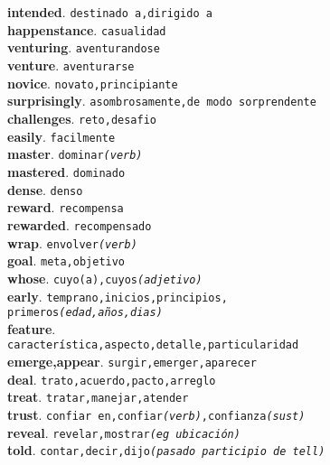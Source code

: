\documentclass[twocolumn]{article}
\begin{document}
	\textsf{\textbf{intended}}. \texttt{destinado a,dirigido a}\\
	\textsf{\textbf{happenstance}}. \texttt{casualidad}\\
	\textsf{\textbf{venturing}}. \texttt{aventurandose}\\
	\textsf{\textbf{venture}}. \texttt{aventurarse}\\
	\textsf{\textbf{novice}}. \texttt{novato,principiante}\\
	\textsf{\textbf{surprisingly}}. \texttt{asombrosamente,de modo sorprendente}\\
	\textsf{\textbf{challenges}}. \texttt{reto,desafio}\\
	\textsf{\textbf{easily}}. \texttt{facilmente}\\
	\textsf{\textbf{master}}. \texttt{dominar{\scriptsize \textsl{(verb)}}}\\
	\textsf{\textbf{mastered}}. \texttt{dominado}\\
	\textsf{\textbf{dense}}. \texttt{denso}\\
	\textsf{\textbf{reward}}. \texttt{recompensa}\\
	\textsf{\textbf{rewarded}}. \texttt{recompensado}\\
	\textsf{\textbf{wrap}}. \texttt{envolver{\scriptsize \textsl{(verb)}}}\\
	\textsf{\textbf{goal}}. \texttt{meta,objetivo}\\
	\textsf{\textbf{whose}}. \texttt{cuyo(a),cuyos{\scriptsize \textsl{(adjetivo)}}}\\
	\textsf{\textbf{early}}. \texttt{temprano,inicios,principios,\\primeros{\scriptsize \textsl{(edad,a\~nos,dias)}}}\\
	\textsf{\textbf{feature}}.\\\texttt{caracter\'istica,aspecto,detalle,particularidad}\\
	\textsf{\textbf{emerge,appear}}. \texttt{surgir,emerger,aparecer}\\
	\textsf{\textbf{deal}}. \texttt{trato,acuerdo,pacto,arreglo}\\
	\textsf{\textbf{treat}}. \texttt{tratar,manejar,atender}\\
	\textsf{\textbf{trust}}. \texttt{confiar en,confiar{\scriptsize \textsl{(verb)}},confianza{\scriptsize \textsl{(sust)}}}\\
	\textsf{\textbf{reveal}}. \texttt{revelar,mostrar{\scriptsize \textsl{(eg ubicaci\'on)}}}\\
	\textsf{\textbf{told}}. \texttt{contar,decir,dijo{\scriptsize \textsl{(pasado participio de tell)}}}\\
\end{document}
